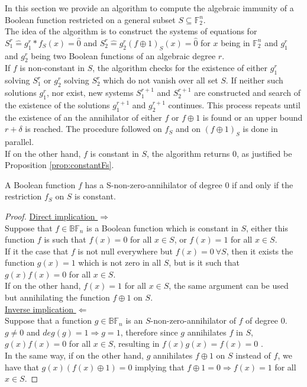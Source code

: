 \documentclass[11pt]{llncs}
\begin{document}
In this section we provide an algorithm to compute the algebraic immunity of a Boolean function restricted on a general subset $S \subseteq \mathbb{F}_2^n$.\\
The idea of the algorithm is to construct the systems of equations for $S_1^r \hat{=}g_1^r*f_S (x)= \hat{0}$ and $S_2^r\hat{=}g_2^r (f\oplus 1)_S (x) = \hat{0}$ for $x$ being in $\mathbb{F}_2^n$ and $g_1^r$ and $g_2^r$ being two Boolean functions of an algebraic degree $r$.\\
If $f$ is non-constant in $S$, the algorithm checks for the existence of either $g_1^r$ solving $S_1^r$ or $g_2^r$ solving $S_2^r$ which do not vanish over all set $S$. If neither such solutions $g_1^r$, nor exist, new systems $S_1^{r+1}$ and $S_2^{r+1}$ are constructed and search of the existence of the solutions $g_{1}^{r+1}$ and $g_2^{r+1}$ continues. This process repeats until the existence of an the annihilator of either $f$ or $f\oplus 1$ is found or an upper bound $r+\delta$ is reached. The procedure followed on $f_S$ and on $(f\oplus 1)_S$ is done in parallel.\\
If on the other hand, $f$ is constant in $S$, the algorithm returns $0$, as justified be Proposition \ref{prop:constantFs}.

\begin{proposition}\label{prop:constantFs}
	A Boolean function $f$ has a S-non-zero-annihilator of degree $0$ if and only if the restriction $f_S$ on $S$ is constant.
\end{proposition}
\begin{proof}
	\underline{Direct implication $\Rightarrow$}\\
	Suppose that $f\in \mathbb{BF}_n$ is a Boolean function which is constant in $S$, either this function $f$ is such that $f(x) = 0$ for all $x\in S$, or $f(x) = 1$ for all $x\in S$.\\
	If it the case that $f$ is not null everywhere but $f(x) = 0\ \forall S$, then it exists the function $g(x) = 1$ which is not zero in all $S$, but is it such that $g(x)f(x) = 0$ for all $x\in S$.\\ 
	If on the other hand, $f(x) = 1$ for all $x\in S$, the same argument can be used but annihilating the function $f\oplus 1$ on $S$.\\
	\underline{Inverse implication $\Leftarrow$}\\
	Suppose that a function $g\in \mathbb{BF}_n$ is an $S$-non-zero-annihilator of $f$ of degree $0$.\\
	$g \neq 0$ and $deg(g) = 1 \Rightarrow g = 1$, therefore since $g$ annihilates $f$ in $S$,  $g(x) f(x) = 0$ for all $x \in S$, resulting in $f(x)g(x) = f(x) = 0$ .\\
	In the same way, if on the other hand, $g$ annihilates $f\oplus 1$ on $S$ instead of $f$, we have that $g(x)(f(x) \oplus 1) = 0$ implying that $f\oplus 1 = 0 \Rightarrow f(x) = 1$ for all $x\in S$. 
\end{proof}
\end{document}
